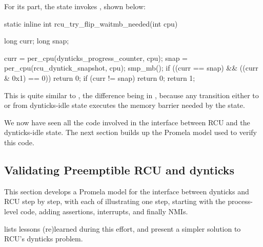 For its part, the  state
invokes , shown below:

\begin{fcvlabel}
\begin{VerbatimN}[commandchars=\\\[\]]
static inline int
rcu_try_flip_waitmb_needed(int cpu)
{
	long curr;
	long snap;

	curr = per_cpu(dynticks_progress_counter, cpu);
	snap = per_cpu(rcu_dyntick_snapshot, cpu);
	smp_mb();
	if ((curr == snap) && ((curr & 0x1) == 0))
		return 0;
	if (curr != snap)		
		return 0;		\lnlbl[ret_0]
	return 1;
}
\end{VerbatimN}
\end{fcvlabel}

\begin{fcvref}
This is quite similar to ,
the difference being in , because any transition
either to or from dynticks-idle state executes the memory barrier
needed by the  state.
\end{fcvref}

We now have seen all the code involved in the interface between
RCU and the dynticks-idle state.
The next section builds up the Promela model used to verify this
code.

\QuickQuizEnd

\subsection{Validating Preemptible RCU and dynticks}
\label{sec:formal:Validating Preemptible RCU and dynticks}

This section develops a Promela model for the interface between
dynticks and RCU step by step, with each of
illustrating one step, starting with the process-level code,
adding assertions, interrupts, and finally NMIs.

 lists
lessons (re)learned during this effort, and
present a simpler solution to RCU's dynticks problem.

